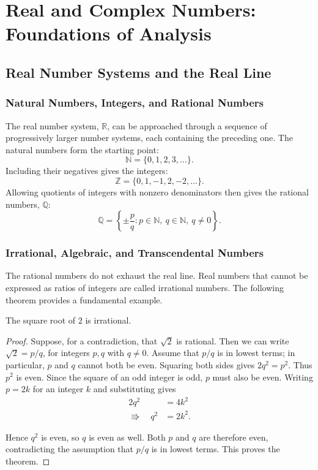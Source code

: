 \chapter{Real and Complex Numbers: Foundations of Analysis}

\section{Real Number Systems and the Real Line}

\subsection{Natural Numbers, Integers, and Rational Numbers}

The real number system, $\mathbb{R}$, can be approached through a sequence of progressively larger number systems, each containing the preceding one.
The natural numbers form the starting point:
\[
\mathbb{N} = \{0, 1, 2, 3, \dots\}.
\]
Including their negatives gives the integers:
\[
\mathbb{Z} = \{0, 1, -1, 2, -2, \dots\}.
\]
Allowing quotients of integers with nonzero denominators then gives the rational numbers, $\mathbb{Q}$:
\[
\mathbb{Q} = \left\{ \pm \frac{p}{q} : p \in \mathbb{N}, \ q \in \mathbb{N}, \ q \neq 0 \right\}.
\]

\subsection{Irrational, Algebraic, and Transcendental Numbers}

The rational numbers do not exhaust the real line. Real numbers that cannot be expressed as ratios of integers are called irrational numbers.
The following theorem provides a fundamental example.

\begin{theorem}
The square root of $2$ is irrational.
\end{theorem}

\begin{proof}
Suppose, for a contradiction, that $\sqrt{2}$ is rational. Then we can write $\sqrt{2} = p/q$, for integers $p, q$ with $q \neq 0$. Assume that $p/q$ is in lowest terms; in particular, $p$ and $q$ cannot both be even.
Squaring both sides gives $2 q^2 = p^2$. Thus $p^2$ is even. Since the square of an odd integer is odd, $p$ must also be even.
Writing $p = 2k$ for an integer $k$ and substituting gives
\[
\begin{aligned}
2q^2 &= 4k^2  \\
\Rrightarrow\quad  q^2 &= 2k^2.
\end{aligned}
\]

Hence $q^2$ is even, so $q$ is even as well. Both $p$ and $q$ are therefore even, contradicting the assumption that $p/q$ is in lowest terms.
This proves the theorem.
\end{proof}

